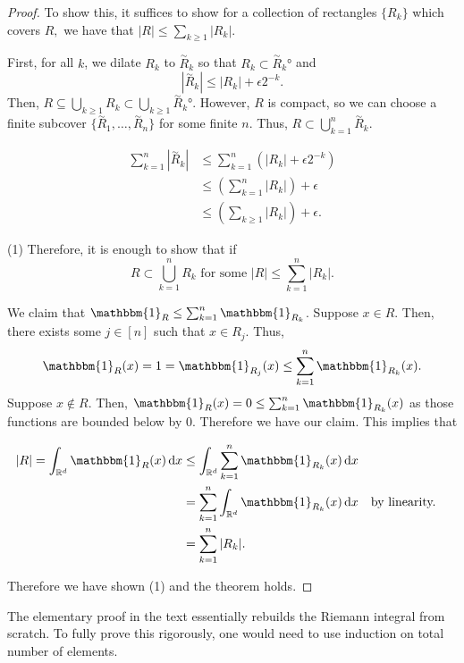 \documentclass{amsart}
\newcommand{\parens}[1]{\left( #1\right)}
\theoremstyle{definition}
\numberwithin{equation}{section}
\newcommand{\s}[1]{\{#1\}}
\newcommand{\n}{\not}
\newcommand{\nin}{\n\in}
\newcommand{\THEN}{\text{ for some }}
\newcommand{\ind}{\mathbbm{1}}
\newcommand{\R}{\mathbb{R}}
\newcommand*\diff{\mathop{}\!\mathrm{d}}
\newcommand{\tilR}{\overset{\sim}{R}}
\begin{document}
    \begin{proof}

      To show this, it suffices to show for a collection of rectangles $\s{R_k}$ which covers $R,$ we have that $|R| \leq \sum_{k \geq 1}|R_k|$.

      First, for all $k$, we dilate $R_k$ to $\tilR_k$ so that $R_k \subset \tilR_k°$ and
      \[|\tilR_k| \leq |R_k| + \epsilon 2^{-k}.\]
      Then, $R \subseteq \bigcup_{k\geq1}R_k \subset \bigcup_{k\geq1}\tilR_k°.$ However, $R$ is compact, so we can choose a finite subcover $\s{\tilR_1, \ldots, \tilR_n}$ for some finite $n$. Thus, $R \subset \bigcup_{k=1}^n\tilR_k.$

      \begin{align*}
        \sum_{k=1}^n|\tilR_k| &\leq \sum_{k=1}^n(|R_k| + \epsilon 2^{-k})\\
        &\leq \parens{\sum_{k=1}^n|R_k|} + \epsilon\\
        &\leq \parens{\sum_{k\geq1}|R_k|} + \epsilon.
      \end{align*}

      (1) Therefore, it is enough to show that if
      \[R \subset \bigcup_{k=1}^n R_k \THEN |R| \leq \sum_{k=1}^n|R_k|.\]

      We claim that $\ind_R \leq \sum_{k=1}^n\ind_{R_k}$. Suppose $x \in R$. Then, there exists some $j \in [n]$ such that
      $x \in R_j$. Thus, \[\ind_R(x) = 1 = \ind_{R_j}(x) \leq \sum_{k=1}^n\ind_{R_k}(x).\]
      Suppose $x \nin R$. Then, $\ind_R(x) = 0 \leq \sum_{k=1}^n\ind_{R_k}(x)$ as those functions are bounded below by $0$. Therefore we have our claim. This implies that

      \begin{align*}
        |R| = \int_{\R^d}\ind_R(x)\diff x &\leq \int_{\R^d}\sum_{k=1}^n\ind_{R_k}(x)\diff x\\
        &= \sum_{k=1}^n \int_{\R^d}\ind_{R_k}(x) \diff x &&\text{by linearity.}\\
        &= \sum_{k=1}^n|R_k|.
      \end{align*}

      Therefore we have shown (1) and the theorem holds.

    \end{proof}

  \begin{remark}

    The elementary proof in the text essentially rebuilds the Riemann integral from scratch. To fully prove this rigorously, one would need to use induction on total number of elements.

  \end{remark}
\end{document}
